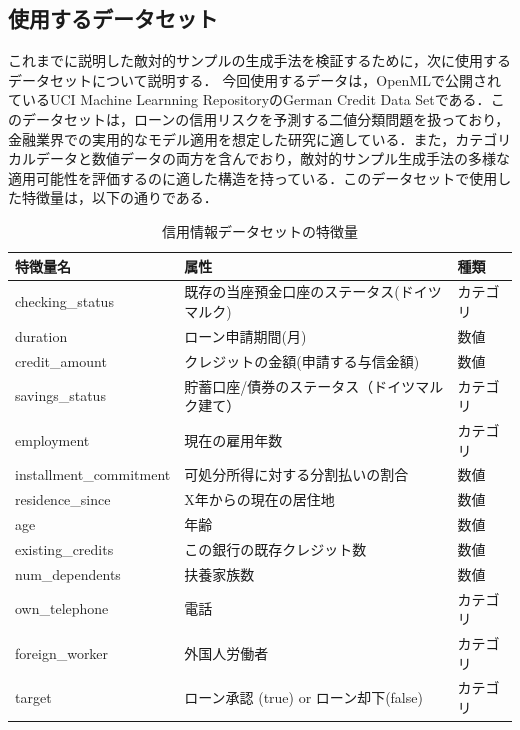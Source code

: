 \subsection{使用するデータセット}
これまでに説明した敵対的サンプルの生成手法を検証するために，次に使用するデータセットについて説明する．
今回使用するデータは，OpenMLで公開されているUCI Machine Learnning RepositoryのGerman Credit Data Setである．\cite{credit-g}このデータセットは，ローンの信用リスクを予測する二値分類問題を扱っており，金融業界での実用的なモデル適用を想定した研究に適している．また，カテゴリカルデータと数値データの両方を含んでおり，敵対的サンプル生成手法の多様な適用可能性を評価するのに適した構造を持っている．このデータセットで使用した特徴量は，以下の通りである．

\begin{table}[H]
    \centering
    \caption{信用情報データセットの特徴量}
    \begin{tabular}{|l|l|l|}
        \hline
        特徴量名 & 属性 & 種類 \\ \hline
        checking\_status & 既存の当座預金口座のステータス(ドイツマルク) & カテゴリ \\ \hline
        duration & ローン申請期間(月) & 数値 \\ \hline
        credit\_amount & クレジットの金額(申請する与信金額) & 数値 \\ \hline
        savings\_status & 貯蓄口座/債券のステータス（ドイツマルク建て） & カテゴリ \\ \hline
        employment & 現在の雇用年数 & カテゴリ \\ \hline
        installment\_commitment & 可処分所得に対する分割払いの割合 & 数値 \\ \hline
        residence\_since & X年からの現在の居住地 & 数値 \\ \hline
        age & 年齢 & 数値 \\ \hline
        existing\_credits & この銀行の既存クレジット数 & 数値 \\ \hline
        num\_dependents & 扶養家族数 & 数値 \\ \hline
        own\_telephone & 電話 & カテゴリ \\ \hline
        foreign\_worker & 外国人労働者 & カテゴリ \\ \hline
        target & ローン承認 (true) or ローン却下(false) & カテゴリ \\ \hline
    \end{tabular}
    \label{tab:credit_g_features}
\end{table}

